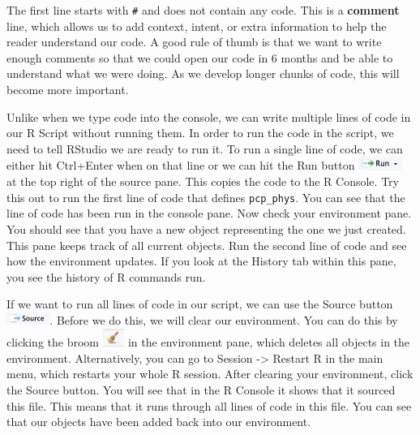 \documentclass[
  letterpaper,
]{latex/krantz}
\begin{document}
The first line starts with \texttt{\#} and does not contain any code.
This is a \textbf{comment} line, which allows us to add
context, intent, or extra information to help the reader understand our
code. A good rule of thumb is that we want to write enough comments so
that we could open our code in 6 months and be able to understand what
we were doing. As we develop longer chunks of code, this will become
more important.

Unlike when we type code into the console, we can write multiple lines
of code in our R Script without running them. In order to run the code
in the script, we need to tell RStudio we are ready to run it. To run a
single line of code, we can either hit Ctrl+Enter when on that line or
we can hit the Run button
\includegraphics[width=0.55556in,height=\textheight]{book/images/intro_to_r/run-script.png}
at the top right of the source pane. This copies the code to the R
Console. Try this out to run the first line of code that defines
\texttt{pcp\_phys}. You can see that the line of code has been run in
the console pane. Now check your environment
pane. You should see that you have a
new object representing the one we just created. This pane keeps track
of all current objects. Run the second line of code and see how the
environment updates. If you look at the History tab within this pane,
you see the history of R commands run.

If we want to run all lines of code in our script, we can use the Source
button
\includegraphics[width=0.55556in,height=\textheight]{book/images/intro_to_r/source.png}.
Before we do this, we will clear our environment. You can do this by
clicking the broom
\includegraphics[width=0.27778in,height=\textheight]{book/images/intro_to_r/broom.png}
in the environment pane, which deletes all objects in the environment.
Alternatively, you can go to Session -\textgreater{} Restart R in the
main menu, which restarts your whole R session. After clearing your
environment, click the Source button. You will see that in the R Console
it shows that it sourced this file. This means that it runs through all
lines of code in this file. You can see that our objects have been added
back into our environment.
\end{document}
